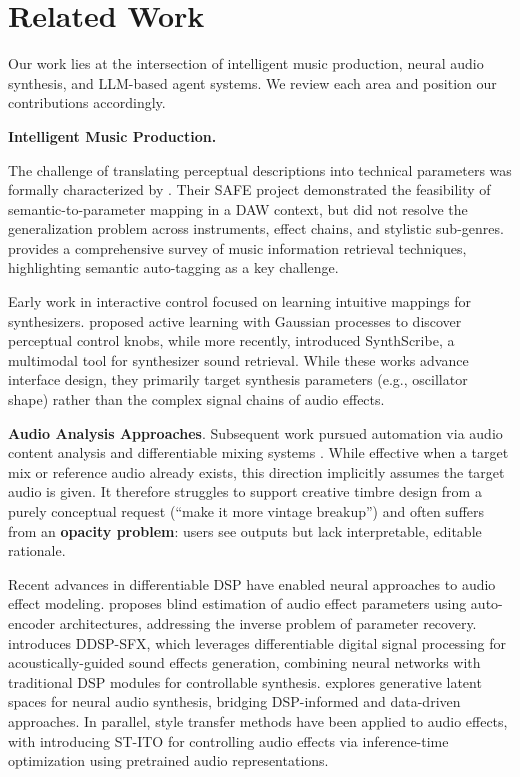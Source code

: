 \documentclass{article}
\begin{document}
\section{Related Work}
\label{sec:related_work}

Our work lies at the intersection of intelligent music production, neural audio synthesis, and LLM-based agent systems. We review each area and position our contributions accordingly.

\noindent\textbf{Intelligent Music Production.}

The challenge of translating perceptual descriptions into technical parameters was formally characterized by \citet{stables2014semantic}. Their SAFE project demonstrated the feasibility of semantic-to-parameter mapping in a DAW context, but did not resolve the generalization problem across instruments, effect chains, and stylistic sub-genres. \citet{schedl2014survey} provides a comprehensive survey of music information retrieval techniques, highlighting semantic auto-tagging as a key challenge.

Early work in interactive control focused on learning intuitive mappings for synthesizers. \citet{kuli2014active} proposed active learning with Gaussian processes to discover perceptual control knobs, while more recently, \citet{bryan2024synthscribe} introduced SynthScribe, a multimodal tool for synthesizer sound retrieval. While these works advance interface design, they primarily target synthesis parameters (e.g., oscillator shape) rather than the complex signal chains of audio effects.

\textbf{Audio Analysis Approaches}. Subsequent work pursued automation via audio content analysis and differentiable mixing systems \citep{martinez2020deep,steinmetz2022automix,moliner2025megami}. While effective when a target mix or reference audio already exists, this direction implicitly assumes the target audio is given. It therefore struggles to support creative timbre design from a purely conceptual request (``make it more vintage breakup'') and often suffers from an \textbf{opacity problem}: users see outputs but lack interpretable, editable rationale.

Recent advances in differentiable DSP have enabled neural approaches to audio effect modeling. \citet{peladeau2024blind} proposes blind estimation of audio effect parameters using auto-encoder architectures, addressing the inverse problem of parameter recovery. \citet{liu2024ddspSFX} introduces DDSP-SFX, which leverages differentiable digital signal processing for acoustically-guided sound effects generation, combining neural networks with traditional DSP modules for controllable synthesis. \citet{deemanat2025latent} explores generative latent spaces for neural audio synthesis, bridging DSP-informed and data-driven approaches. In parallel, style transfer methods have been applied to audio effects, with \citet{benetos2024stito} introducing ST-ITO for controlling audio effects via inference-time optimization using pretrained audio representations.
\end{document}

